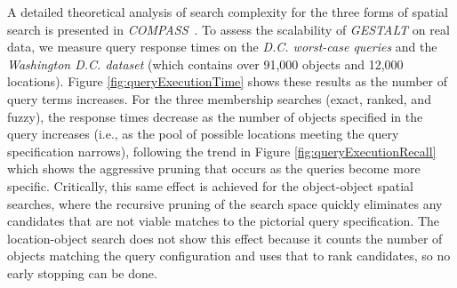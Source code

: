 A detailed theoretical analysis of search complexity for the three forms of spatial search is presented in \emph{COMPASS}~\cite{Osul2023}.
To assess the scalability of \emph{GESTALT} on real data, we measure query response times on the \textit{D.C. worst-case queries} and the \textit{Washington D.C. dataset} (which contains over 91,000 objects and 12,000 locations).
Figure \ref{fig:queryExecutionTime} shows these results as the number of query terms increases. 
For the three membership searches (exact, ranked, and fuzzy), the response times decrease as the number of objects specified in the query increases (i.e., as the pool of possible locations meeting the query specification narrows), following the trend in Figure \ref{fig:queryExecutionRecall} which shows the aggressive pruning that occurs as the queries become more specific.
Critically, this same effect is achieved for the object-object spatial searches, where the recursive pruning of the search space quickly eliminates any candidates that are not viable matches to the pictorial query specification.
The location-object search does not show this effect because it counts the number of objects matching the query configuration and uses that to rank candidates, so no early stopping can be done. 














